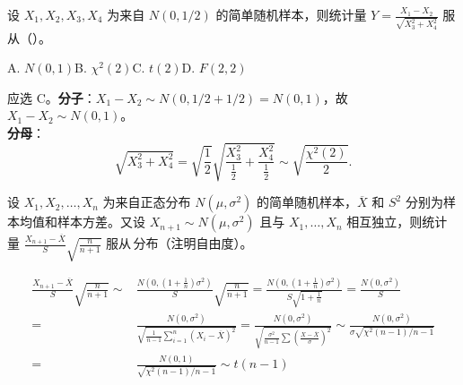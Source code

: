 \documentclass[lang=cn,11pt]{elegantbook}
\begin{document}
\begin{exercise} \label{ex:sampling_04}
设 \(X_1,X_2,X_3,X_4\) 为来自 \(N(0,1/2)\) 的简单随机样本，则统计量
\(
Y=\frac{X_1-X_2}{\sqrt{X_3^2+X_4^2}}
\)
服从（\quad）。\par
A. \(N(0,1)\)\qquad B. \(\chi^2(2)\)\qquad C. \(t(2)\)\qquad D. \(F(2,2)\)
\end{exercise}
\begin{solution}
应选 C。\textbf{分子}：\(X_1-X_2\sim N(0,1/2+1/2)=N(0,1)\)，故 \(X_1-X_2\sim N(0,1)\)。\\
\textbf{分母}：
\[\sqrt{X_3^2+X_4^2}=\sqrt{\frac12}\sqrt{\frac{X_3^2}{\frac12}+\frac{X_4^2}{\frac12}}\sim\sqrt{\frac{\chi^2(2)}{2}}.\]
\end{solution}


\begin{exercise}\label{exer:6-t-new}
设 \(X_1, X_2, \dots, X_n\) 为来自正态分布 \(N(\mu, \sigma^2)\) 的简单随机样本，\(\overline{X}\) 和 \(S^2\) 分别为样本均值和样本方差。又设 \(X_{n+1} \sim N(\mu, \sigma^2)\) 且与 \(X_1, \dots, X_n\) 相互独立，则统计量
\(
\frac{X_{n+1} - \overline{X}}{S}\sqrt{\frac{n}{n+1}}
\)
服从\,\underline{\hspace{2cm}}分布（注明自由度）。
\end{exercise}

\begin{solution}
\begin{align*}
\frac{X_{n+1} - \overline{X}}{S}\sqrt{\frac{n}{n+1}}\sim&\frac{N(0,(1+\frac{1}{n})\sigma^2)}{S}\sqrt{\frac{n}{n+1}}=\frac{N(0,(1+\frac{1}{n})\sigma^2)}{S\sqrt{1+\frac{1}{n}}}=\frac{N(0,\sigma^2)}{S}\\
=&\frac{N(0,\sigma^2)}{\sqrt{\frac1{n-1}\sum_{i=1}^n (X_i-\overline X)^2}}=\frac{N(0,\sigma^2)}{\sqrt{\frac{\sigma^2}{n-1}\sum(\frac{X-\overline{X}}{\sigma})^2}}\sim\frac{N(0,\sigma^2)}{\sigma\sqrt{\chi^2(n-1)/n-1}}\\
=&\frac{N(0,1)}{\sqrt{\chi^2(n-1)/n-1}}\sim t(n-1)
\end{align*}
\end{solution}
\end{document}
